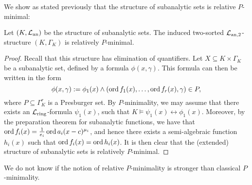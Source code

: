 We show as stated previously that the structure of subanalytic sets is relative $P$-minimal:

\begin{lem}\label{lem:suban}
Let $(K, \mathcal{L}_{\text{an}})$ be the structure of subanalytic sets. The induced two-sorted $\mathcal{L}_{\text{an},2}$-structure $(K, \Gamma_K)$ is relatively $P$-minimal. 
\end{lem}
\begin{proof}
Recall that this structure has elimination of quantifiers. Let $X \subseteq K \times \Gamma_K$ be a subanalytic set, defined by a formula $\phi(x,\gamma)$. This formula can then be written in the form
\[\phi(x,\gamma):= \phi_1(x) \wedge (\operatorname{ord} f_1(x), \ldots, \operatorname{ord} f_r(x), \gamma) \in P,\]
where $P \subseteq \Gamma_K^{r}$ is a Presburger set. 
By $P$-minimality, we may assume that there exists an $\mathcal{L}_{\text{ring}}$-formula $\psi_1(x)$, such that $K \models \psi_1(x) \leftrightarrow \phi_1(x)$. Moreover, by the preparation theorem for subanalytic functions, we have that $\operatorname{ord} f_i(x) = \frac1{e_i}\operatorname{ord} a_i(x-c)^{\mu_i}$, and hence there exists a semi-algebraic function $h_i(x)$ such that $\operatorname{ord} f_i(x) = \operatorname{ord} h_i(x)$. It is then clear that the (extended) structure of subanalytic sets is relatively $P$-minimal.
\end{proof}

We do not know if the notion of relative $P$-minimality is stronger than classical $P$-minimality. 

 
